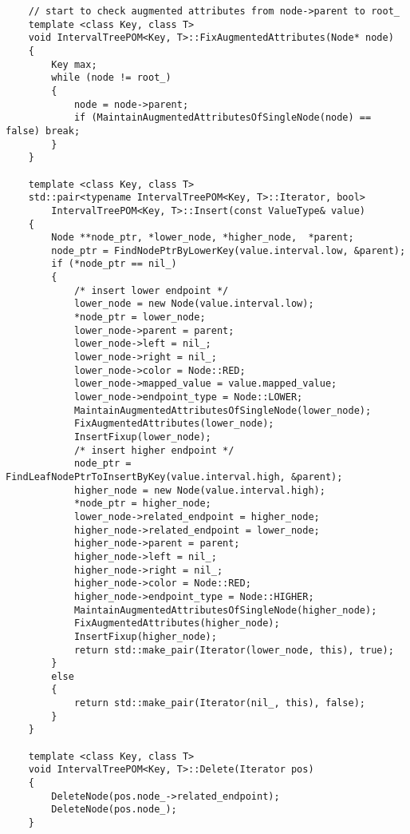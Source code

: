 \begin{verbatim}
    // start to check augmented attributes from node->parent to root_
    template <class Key, class T>
    void IntervalTreePOM<Key, T>::FixAugmentedAttributes(Node* node)
    {
        Key max;
        while (node != root_)
        {
            node = node->parent;
            if (MaintainAugmentedAttributesOfSingleNode(node) == false) break;
        }
    }

    template <class Key, class T>
    std::pair<typename IntervalTreePOM<Key, T>::Iterator, bool> 
        IntervalTreePOM<Key, T>::Insert(const ValueType& value)
    {
        Node **node_ptr, *lower_node, *higher_node,  *parent;
        node_ptr = FindNodePtrByLowerKey(value.interval.low, &parent);
        if (*node_ptr == nil_)
        {
            /* insert lower endpoint */
            lower_node = new Node(value.interval.low);
            *node_ptr = lower_node;
            lower_node->parent = parent;
            lower_node->left = nil_;
            lower_node->right = nil_;
            lower_node->color = Node::RED;
            lower_node->mapped_value = value.mapped_value;
            lower_node->endpoint_type = Node::LOWER;
            MaintainAugmentedAttributesOfSingleNode(lower_node);
            FixAugmentedAttributes(lower_node);
            InsertFixup(lower_node);
            /* insert higher endpoint */
            node_ptr = FindLeafNodePtrToInsertByKey(value.interval.high, &parent);
            higher_node = new Node(value.interval.high);
            *node_ptr = higher_node;
            lower_node->related_endpoint = higher_node;
            higher_node->related_endpoint = lower_node;
            higher_node->parent = parent;
            higher_node->left = nil_;
            higher_node->right = nil_;
            higher_node->color = Node::RED;
            higher_node->endpoint_type = Node::HIGHER;
            MaintainAugmentedAttributesOfSingleNode(higher_node);
            FixAugmentedAttributes(higher_node);
            InsertFixup(higher_node);
            return std::make_pair(Iterator(lower_node, this), true);
        }
        else
        {
            return std::make_pair(Iterator(nil_, this), false);
        }
    }

    template <class Key, class T>
    void IntervalTreePOM<Key, T>::Delete(Iterator pos)
    {
        DeleteNode(pos.node_->related_endpoint);
        DeleteNode(pos.node_);
    }


\end{verbatim}
